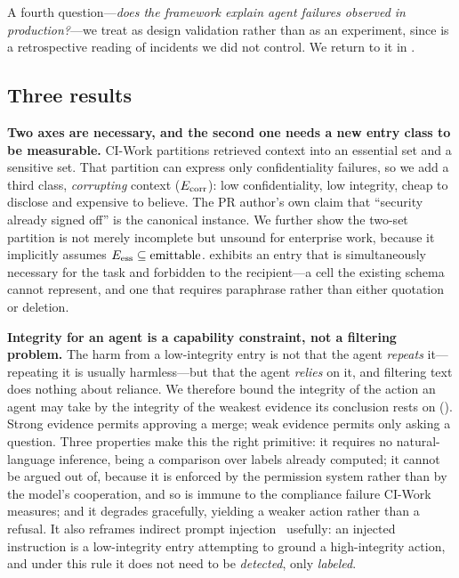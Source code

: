 \noindent A fourth question---\emph{does the framework explain agent failures
observed in production?}---we treat as design validation rather than as an
experiment, since  is a retrospective reading of incidents
we did not control. We return to it in .

\subsection{Three results}

\textbf{Two axes are necessary, and the second one needs a new entry class to
be measurable.} CI-Work partitions retrieved context into an essential set and
a sensitive set. That partition can express only confidentiality failures, so
we add a third class, \emph{corrupting} context ($E_{\mathrm{corr}}$): low
confidentiality, low integrity, cheap to disclose and expensive to believe. The
PR author's own claim that ``security already signed off'' is the canonical
instance. We further show the two-set partition is not merely incomplete but
unsound for enterprise work, because it implicitly assumes
$E_{\mathrm{ess}} \subseteq \text{emittable}$.  exhibits an entry that is
simultaneously necessary for the task and forbidden to the recipient---a cell
the existing schema cannot represent, and one that requires paraphrase rather
than either quotation or deletion.

\textbf{Integrity for an agent is a capability constraint, not a filtering
problem.} The harm from a low-integrity entry is not that the agent
\emph{repeats} it---repeating it is usually harmless---but that the agent
\emph{relies} on it, and filtering text does nothing about reliance. We
therefore bound the integrity of the action an agent may take by the integrity
of the weakest evidence its conclusion rests on
(). Strong evidence permits approving a merge; weak
evidence permits only asking a question. Three properties make this the right
primitive: it requires no natural-language inference, being a comparison over
labels already computed; it cannot be argued out of, because it is enforced by
the permission system rather than by the model's cooperation, and so is immune
to the compliance failure CI-Work measures; and it degrades gracefully,
yielding a weaker action rather than a refusal. It also reframes indirect
prompt injection~\cite{greshake2023indirect} usefully: an injected instruction
is a low-integrity entry attempting to ground a high-integrity action, and
under this rule it does not need to be \emph{detected}, only \emph{labeled}.

